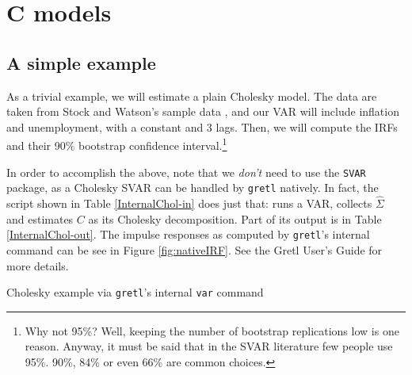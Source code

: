 \documentclass[a4paper,10pt]{article}
\newcommand{\dtk}[1]{\texttt{\detokenize{#1}}}
\newcounter{script}[section]
\begin{document}

\section{C models}
\label{sec:Cmodel}
\subsection{A simple example}

As a trivial example, we will estimate a plain Cholesky model. The
data are taken from Stock and Watson's sample data
\dtk{sw_ch14.gdt}, and our VAR will include inflation and
unemployment, with a constant and 3 lags. Then, we will compute the
IRFs and their 90\% bootstrap confidence interval.\footnote{Why not
  95\%? Well, keeping the number of bootstrap replications low is one
  reason. Anyway, it must be said that in the SVAR literature few
  people use 95\%. 90\%, 84\% or even 66\% are common choices.}
  
In order to accomplish the above, note that we \emph{don't} need to
use the \texttt{SVAR} package, as a Cholesky SVAR can be handled by
\texttt{gretl} natively. In fact, the script shown in Table
\ref{InternalChol-in} does just that: runs a VAR, collects
$\hat{\Sigma}$ and estimates $C$ as its Cholesky decomposition. 
Part of its output is in Table \ref{InternalChol-out}.  The impulse
responses as computed by \texttt{gretl}'s internal command can be see
in Figure \ref{fig:nativeIRF}. See the Gretl User's Guide for more
details.  
  
\begin{table}[htbp]
  \caption{Cholesky example via \texttt{gretl}'s internal 
  \texttt{var} command}
   \label{InternalChol-in}
\end{table}
\end{document}

